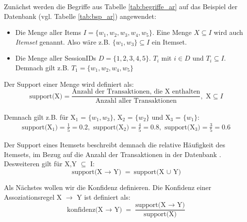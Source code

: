 Zunächst werden die Begriffe aus Tabelle \ref{tab:begriffe_ar} auf das Beispiel der Datenbank (vgl. Tabelle \ref{tab:bsp_ar}) angewendet:
\begin{itemize}
	\item Die Menge aller Items $I = \{w_1, w_2, w_3, w_4, w_5\}$. Eine Menge $X \subseteq I$ wird auch \textit{Itemset} genannt. Also wäre z.B. $\{w_1, w_3\} \subseteq I$ ein Itemset.
	\item Die Menge aller SessionIDs $D = \{1,2,3,4,5\}$. $T_i$ mit $i \in D$ und $T_i \subseteq I$. Demnach gilt z.B. $T_1 = \{w_1,w_2,w_4,w_5\}$
\end{itemize}

Der Support einer Menge wird definiert als:\\

\begin{equation*}
	\text{support(X)} = \frac{\text{Anzahl der Transaktionen, die X enthalten}}{\text{Anzahl aller Transaktionen}}, \text{ X} \subseteq I
\end{equation*}\\

Demnach gilt z.B. für X$_1$ =  $\{w_1,w_3\}$, X$_2$ = $\{w_2\}$ und X$_3$ = $\{w_1\}$:\\
\begin{equation*}
	\begin{split}
		\text{support(X$_1$)} = \frac{1}{5} = 0.2 ,\text{ support(X$_2$)} = \frac{4}{5} = 0.8, \text{ support(X$_3$)} = \frac{3}{5} = 0.6
	\end{split}
\end{equation*}

Der Support eines Itemsets beschreibt demnach die relative Häufigkeit des Itemsets, im Bezug auf die Anzahl der Transaktionen in der Datenbank \citep{BeKe19}. Desweiteren gilt für X,Y $\subseteq$ I:\\
\begin{equation*}
	\text{support(X $\rightarrow$ Y)} = \text{support(X $\cup$ Y)}
\end{equation*}

Als Nächstes wollen wir die Konfidenz definieren. Die Konfidenz einer Assoziationsregel X $\rightarrow$ Y ist definiert als:\\
\begin{equation*}
	\text{konfidenz(X $\rightarrow$ Y)} = \frac{\text{support(X $\rightarrow$ Y)}}{\text{support(X)}}
\end{equation*}


